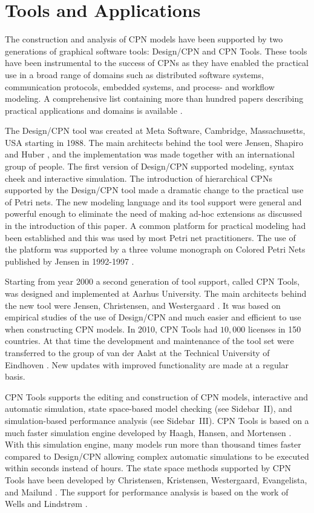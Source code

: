 \section{Tools and Applications}

The construction and analysis of CPN models have been supported by two
generations of graphical software tools: Design/CPN and CPN
Tools. These tools have been instrumental to the success of CPNs as
they have enabled the practical use in a broad range of domains such
as distributed software systems, communication protocols, embedded
systems, and process- and workflow modeling. A comprehensive list
containing more than hundred papers describing practical applications
and domains is available \cite{cpnuse}.

The Design/CPN tool \cite{tacas97} was created at Meta Software,
Cambridge, Massachusetts, USA starting in 1988. The main architects
behind the tool were Jensen, Shapiro and Huber
\cite{jensen:cpnmanual}, and the implementation was made together with
an international group of people. The first version of Design/CPN
supported modeling, syntax cheek and interactive simulation. The
introduction of hierarchical CPNs supported by the Design/CPN tool
made a dramatic change to the practical use of Petri nets. The new
modeling language and its tool support were general and powerful
enough to eliminate the need of making ad-hoc extensions as discussed
in the introduction of this paper. A common platform for practical
modeling had been established and this was used by most Petri net
practitioners. The use of the platform was supported by a three volume
monograph on Colored Petri Nets published by Jensen in 1992-1997
\cite{jensen:cpnvols}.  

Starting from year 2000 a second generation of tool support, called
CPN Tools, was designed and implemented at Aarhus University. The main
architects behind the new tool were Jensen, Christensen, and
Westergaard \cite{cpn2003}.  It was based on empirical studies of the
use of Design/CPN and much easier and efficient to use when
constructing CPN models. In 2010, CPN Tools had $10,000$ licenses in 150
countries. At that time the development and maintenance of the tool
set were transferred to the group of van der Aalst at the Technical
University of Eindhoven \cite{cpntoolsweb}. New updates with improved
functionality are made at a regular basis.

CPN Tools supports the editing and construction of CPN models,
interactive and automatic simulation, state space-based model checking
(see Sidebar~II), and simulation-based performance analysis (see
Sidebar~III). CPN Tools is based on a much faster simulation engine
developed by Haagh, Hansen, and Mortensen \cite{mortensen:01}. With
this simulation engine, many models run more than thousand times
faster compared to Design/CPN allowing complex automatic simulations
to be executed within seconds instead of hours. The state space
methods supported by CPN Tools have been developed by Christensen,
Kristensen, Westergaard, Evangelista, and Mailund
\cite{sweep,asap}. The support for performance
analysis is based on the work of Wells and Lindstr\o{}m
\cite{performance1}.

